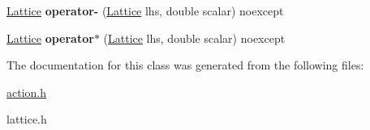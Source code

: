 \begin{DoxyCompactItemize}
\item 
\hyperlink{classLattice}{Lattice} {\bfseries operator-\/} (\hyperlink{classLattice}{Lattice} lhs, double scalar) noexcept\hypertarget{classLattice_a639c0b3a16e4da87bfcf35fbdc19cb77}{}\label{classLattice_a639c0b3a16e4da87bfcf35fbdc19cb77}

\item 
\hyperlink{classLattice}{Lattice} {\bfseries operator$\ast$} (\hyperlink{classLattice}{Lattice} lhs, double scalar) noexcept\hypertarget{classLattice_a718b8da2ada193995a48d9f6b2cebf5e}{}\label{classLattice_a718b8da2ada193995a48d9f6b2cebf5e}

\end{DoxyCompactItemize}


The documentation for this class was generated from the following files\+:\begin{DoxyCompactItemize}
\item 
\hyperlink{action_8h}{action.\+h}\item 
lattice.\+h\end{DoxyCompactItemize}
